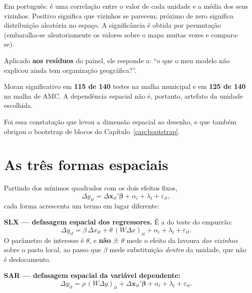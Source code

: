 Em português: é uma correlação entre o valor de cada unidade e a média dos seus
vizinhos. Positivo significa que vizinhos se parecem; próximo de zero significa
distribuição aleatória no espaço. A significância é obtida por permutação
(embaralha-se aleatoriamente os valores sobre o mapa muitas vezes e compara-se).

Aplicado \textbf{aos resíduos} do painel, ele responde a: ``o que o meu modelo
não explicou ainda tem organização geográfica?''.

\begin{ancora}
Moran significativo em \textbf{115 de 140} testes na malha municipal e em
\textbf{125 de 140} na malha de AMC. A dependência espacial não é, portanto,
artefato da unidade escolhida.
\end{ancora}

Foi essa constatação que levou a dimensão espacial ao desenho, e que também
obrigou o bootstrap de blocos do Capítulo~\ref{cap:bootstrap}.

\section{As três formas espaciais}

Partindo dos mínimos quadrados com os dois efeitos fixos,
\begin{equation}
\Delta y_{it} = \Delta \mathbf{x}_{it}' \boldsymbol{\beta} + \alpha_i + \lambda_t + \varepsilon_{it},
\end{equation}
cada forma acrescenta um termo em lugar diferente:

\vspace{6pt}
\textbf{SLX --- defasagem espacial dos regressores.} É a do teste do empurrão:
\begin{equation}
\Delta y_{it} = \beta\, \Delta x_{it} + \theta\, (W\Delta x)_{it} + \alpha_i + \lambda_t + \varepsilon_{it}.
\label{eq:slx}
\end{equation}
O parâmetro de interesse é $\theta$, e \textbf{não} $\beta$: $\theta$ mede o
efeito da lavoura \emph{dos vizinhos} sobre o pasto local, ao passo que $\beta$
mede substituição \emph{dentro} da unidade, que não é deslocamento.

\textbf{SAR --- defasagem espacial da variável dependente:}
\begin{equation}
\Delta y_{it} = \rho\, (W\Delta y)_{it} + \Delta \mathbf{x}_{it}' \boldsymbol{\beta} + \alpha_i + \lambda_t + \varepsilon_{it}.
\end{equation}

